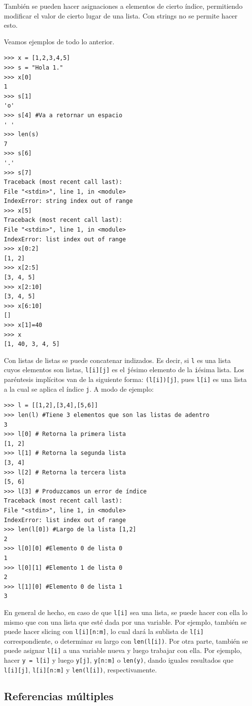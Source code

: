 \documentclass[a4paper, 12pt]{report}
\theoremstyle{definition}
\begin{document}
También se pueden hacer asignaciones a elementos de cierto índice, permitiendo modificar el valor de cierto lugar de una lista. Con strings no se permite hacer esto.

Veamos ejemplos de todo lo anterior.
\begin{verbatim}
>>> x = [1,2,3,4,5]
>>> s = "Hola 1."
>>> x[0]
1
>>> s[1]
'o'
>>> s[4] #Va a retornar un espacio
' '
>>> len(s)
7
>>> s[6]
'.'
>>> s[7]
Traceback (most recent call last):
File "<stdin>", line 1, in <module>
IndexError: string index out of range
>>> x[5]
Traceback (most recent call last):
File "<stdin>", line 1, in <module>
IndexError: list index out of range
>>> x[0:2]
[1, 2]
>>> x[2:5]
[3, 4, 5]
>>> x[2:10]
[3, 4, 5]
>>> x[6:10]
[]
>>> x[1]=40
>>> x
[1, 40, 3, 4, 5]
\end{verbatim}

Con listas de listas se puede concatenar indizados. Es decir, si {\tt l} es una lista cuyos elementos son listas, {\tt l[i][j]} es el {\tt j}ésimo elemento de la {\tt i}ésima lista. Los paréntesis implícitos van de la siguiente forma: {\tt (l[i])[j]}, pues {\tt l[i]} es una lista a la cual se aplica el índice {\tt j}. A modo de ejemplo:
\begin{verbatim}
>>> l = [[1,2],[3,4],[5,6]]
>>> len(l) #Tiene 3 elementos que son las listas de adentro
3
>>> l[0] # Retorna la primera lista
[1, 2]
>>> l[1] # Retorna la segunda lista
[3, 4]
>>> l[2] # Retorna la tercera lista
[5, 6]
>>> l[3] # Produzcamos un error de índice
Traceback (most recent call last):
File "<stdin>", line 1, in <module>
IndexError: list index out of range
>>> len(l[0]) #Largo de la lista [1,2]
2
>>> l[0][0] #Elemento 0 de lista 0
1
>>> l[0][1] #Elemento 1 de lista 0
2
>>> l[1][0] #Elemento 0 de lista 1
3
\end{verbatim}
En general de hecho, en caso de que {\tt l[i]} sea una lista, se puede hacer con ella lo mismo que con una lista que esté dada por una variable. Por ejemplo, también se puede hacer slicing con {\tt l[i][n:m]}, lo cual dará la sublista de {\tt l[i]} correspondiente, o determinar su largo con {\tt len(l[i])}. Por otra parte, también se puede asignar {\tt l[i]} a una variable nueva y luego trabajar con ella. Por ejemplo, hacer {\tt y = l[i]} y luego {\tt y[j]}, {\tt y[n:m]} o {\tt len(y)}, dando iguales resultados que {\tt l[i][j]}, {\tt l[i][n:m]} y {\tt len(l[i])}, respectivamente.
\subsection{Referencias múltiples}\label{sec-memoriaCompartida}
\end{document}
